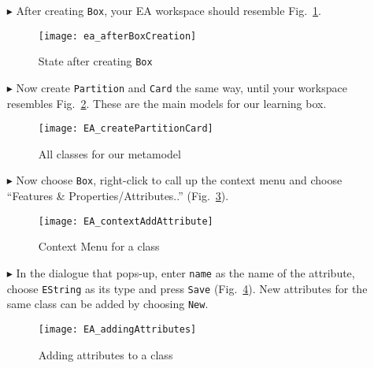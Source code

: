 \begin{itemize}
\vfill
\pagebreak

\item[$\blacktriangleright$] After creating \texttt{Box}, your EA workspace should resemble Fig.~\ref{fig:eclass_completed}.

\begin{figure}[htbp]
	\centering
  \texttt{[image: ea\_afterBoxCreation]}
	\caption{State after creating \texttt{Box}}
	\label{fig:eclass_completed}
\end{figure}

\item[$\blacktriangleright$] Now create \texttt{Partition} and \texttt{Card} the same way, until your workspace resembles Fig.~\ref{fig:all_eclasses}.
These are the main models for our learning box.

\vspace{1cm}

\begin{figure}[htbp]
	\centering
  \texttt{[image: EA\_createPartitionCard]}
	\caption{All classes for our metamodel}
	\label{fig:all_eclasses}
\end{figure}

\vfill
\pagebreak

\item[$\blacktriangleright$] Now choose \texttt{Box}, right-click to call up the context menu and choose ``Features \& Properties/Attributes..''
(Fig.~\ref{fig:attribute}).

\begin{figure}[htbp]
	\centering
  \texttt{[image: EA\_contextAddAttribute]}
	\caption{Context Menu for a class}
	\label{fig:attribute}
\end{figure}
\FloatBarrier

\vspace{0.5cm}

\item[$\blacktriangleright$] In the dialogue that pops-up, enter \texttt{name} as the name of the attribute, choose \texttt{EString} as its type and press
\texttt{Save} (Fig.~\ref{fig:attribute_properties}). New attributes for the same class can be added by choosing \texttt{New}.

\vspace{0.5cm}

\begin{figure}[htbp]
	\centering
  \texttt{[image: EA\_addingAttributes]}
	\caption{Adding attributes to a class}
	\label{fig:attribute_properties}
\end{figure}


\end{itemize}
